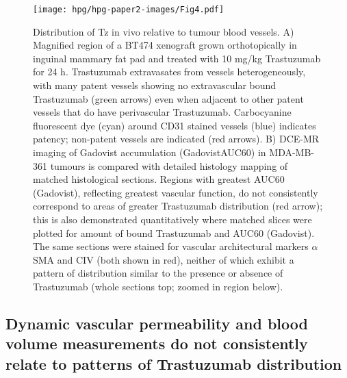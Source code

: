 \begin{figure}[htbp] %
  \centering
  \texttt{[image: hpg/hpg-paper2-images/Fig4.pdf]} 
  \captionsetup{width=1.2\linewidth}
  \caption{Distribution of Tz in vivo relative to tumour blood vessels. 
  A) Magnified region of a \acs{BT474} xenograft grown orthotopically in inguinal mammary fat pad and treated with 10 mg/kg Trastuzumab for 24 h. 
  Trastuzumab extravasates from vessels heterogeneously, with many patent vessels showing no extravascular bound Trastuzumab (green arrows) even when adjacent to other patent vessels that do have perivascular Trastuzumab. 
  Carbocyanine fluorescent dye (cyan) around CD31 stained vessels (blue) indicates patency; non-patent vessels are indicated (red arrows). 
  B) DCE-MR imaging of Gadovist accumulation (GadovistAUC60) in \acs{MDA-MB-361} tumours is compared with detailed histology mapping of matched histological sections. 
  Regions with greatest AUC60 (Gadovist), reflecting greatest vascular function, do not consistently correspond to areas of greater Trastuzumab distribution (red arrow); this is also demonstrated quantitatively where matched slices were plotted for amount of bound Trastuzumab and AUC60 (Gadovist). 
  The same sections were stained for vascular architectural markers $\alpha$SMA and CIV (both shown in red), neither of which exhibit a pattern of distribution similar to the presence or absence of Trastuzumab (whole sections top; zoomed in region below).}
  \label{hpgpaper2:fig4}
\end{figure}

\subsection{Dynamic vascular permeability and blood volume measurements do not consistently relate to patterns of Trastuzumab distribution}

